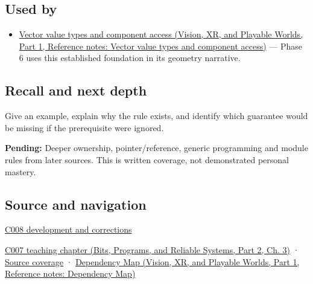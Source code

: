 \subsection{Used by}\label{appendix-3f7e15effba6-used-by}

\hypertarget{appendix-3f7e15effba6-used-by}{}

\begin{itemize}
\tightlist
\item
  \href{../07-Vision-XR-and-Playable-Worlds-P01/main.pdf\#nameddest=appendix-37a39984ba66}{Vector value types and component access (Vision, XR, and Playable Worlds, Part 1, Reference notes: Vector value types and component access)} --- Phase 6 uses this established foundation in its geometry narrative.
\end{itemize}

\subsection{Recall and next depth}\label{appendix-3f7e15effba6-recall-and-next-depth}

\hypertarget{appendix-3f7e15effba6-recall-and-next-depth}{}

Give an example, explain why the rule exists, and identify which guarantee would be missing if the prerequisite were ignored.

\textbf{Pending:} Deeper ownership, pointer/reference, generic programming and module rules from later sources. This is written coverage, not demonstrated personal mastery.

\subsection{Source and navigation}\label{appendix-3f7e15effba6-source-and-navigation}

\hypertarget{appendix-3f7e15effba6-source-and-navigation}{}

\hyperref[appendix-fd090d982a15-m008---parts-113-126]{C008 development and corrections}

\href{../01-Bits-Programs-and-Reliable-Systems-P02/main.pdf\#nameddest=01-foundations-i-ch003-bringing-the-object-model-back-to-bytes}{C007 teaching chapter (Bits, Programs, and Reliable Systems, Part 2, Ch. 3)} · \hyperref[appendix-fd090d982a15-m007---parts-101-112]{Source coverage} · \href{../07-Vision-XR-and-Playable-Worlds-P01/main.pdf\#nameddest=appendix-4ad47bdd269a}{Dependency Map (Vision, XR, and Playable Worlds, Part 1, Reference notes: Dependency Map)}
